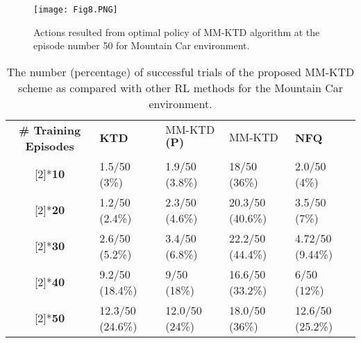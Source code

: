 \documentclass{ieeeaccess}
\def\MMK{\text{MM-KTD}}
\begin{document}
\begin{figure}[t!]
\centering
\texttt{[image: Fig8.PNG]}
\caption{\small Actions resulted from optimal policy of MM-KTD algorithm at the episode number 50 for Mountain Car environment.}\label{Fig:7}
\end{figure}
\begin{table}[t]
\vspace{-.1in}
\caption{\small The number (percentage) of successful trials of the proposed MM-KTD scheme as compared with other RL methods for the Mountain Car environment.}\label{Table:2}
\centering
\begin{tabular}{|c|p{1cm}|p{1.6cm}|p{1.1cm}|p{1.0cm}|}
\hline
\multirow{2}[2]{*}{\textbf{\!\!\!\# Training Episodes\!\!\!}} & \multirow{2}[2]{*}{\textbf{KTD}} &  \multirow{2}[2]{*}{\textbf{$\MMK$ (P)}} &  \multirow{2}[2]{*}{\textbf{$\MMK$}}&  \multirow{2}[2]{*}{\textbf{NFQ}} \\
&&&&\\
\hline
\!\!\!\multirow{2}[2]{*}{\textbf{10}}\!\!\!  & 1.5/50 (3\%) &  1.9/50 \,\,\,\,(3.8\%) &  18/50 (36\%) &  2.0/50 (4\%) \\
\hline
\!\!\!\multirow{2}[2]{*}{\textbf{20}}\!\!\!  & 1.2/50 (2.4\%) &  2.3/50 \,\,\,\,(4.6\%) &  20.3/50 (40.6\%) &  3.5/50 (7\%) \\
\hline
\!\!\!\multirow{2}[2]{*}{\textbf{30}}\!\!\!  & 2.6/50 (5.2\%) &   3.4/50 \,\,\,\,(6.8\%) &  22.2/50 (44.4\%) & 4.72/50 (9.44\%)\\
\hline
\!\!\!\multirow{2}[2]{*}{\textbf{40}}\!\!\!  & 9.2/50 (18.4\%) &  9/50 \,\,\,\,\,\,\,\,(18\%) &  16.6/50 (33.2\%) & 6/50 (12\%) \\
\hline
\!\!\!\multirow{2}[2]{*}{\textbf{50}}\!\!\!  & 12.3/50 (24.6\%) &   12.0/50 (24\%) &  18.0/50 (36\%) & 12.6/50 (25.2\%)\\
\hline
\end{tabular}
\end{table}
\end{document}
